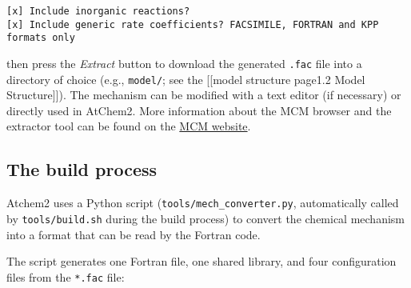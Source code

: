\begin{verbatim}
[x] Include inorganic reactions?
[x] Include generic rate coefficients? FACSIMILE, FORTRAN and KPP formats only
\end{verbatim}

then press the \emph{Extract} button to download the generated
\texttt{.fac} file into a directory of choice (e.g., \texttt{model/};
see the {[}{[}model structure page\textbar{}1.2 Model Structure{]}{]}).
The mechanism can be modified with a text editor (if necessary) or
directly used in AtChem2. More information about the MCM browser and the
extractor tool can be found on the \href{http://mcm.leeds.ac.uk}{MCM
website}.

\subsection{The build process} \label{the-build-process}

Atchem2 uses a Python script (\texttt{tools/mech\_converter.py},
automatically called by \texttt{tools/build.sh} during the build
process) to convert the chemical mechanism into a format that can be
read by the Fortran code.

The script generates one Fortran file, one shared library, and four
configuration files from the \texttt{*.fac} file:

